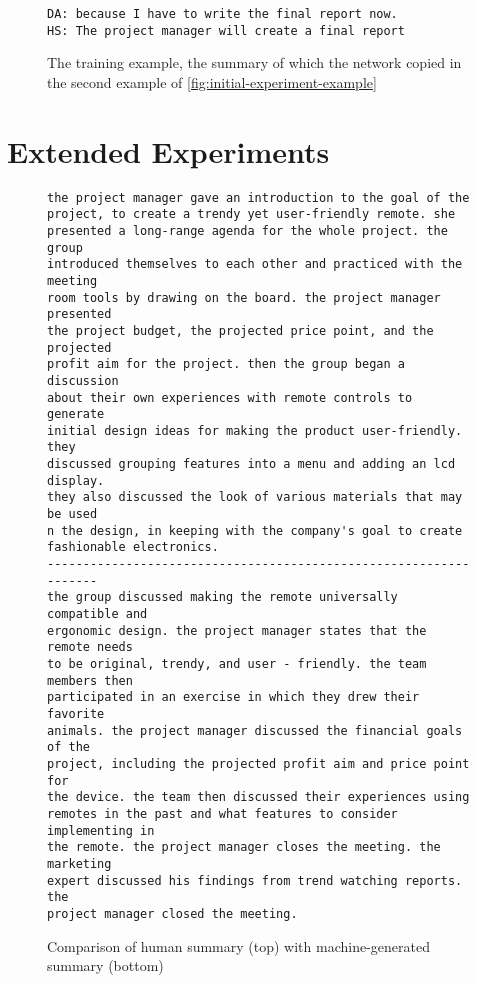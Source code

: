 \begin{figure}[h]
\begin{lstlisting}[numbers=none]
DA: because I have to write the final report now.
HS: The project manager will create a final report
\end{lstlisting}
\caption{The training example, the summary of which the network copied in the second example of \cref{fig:initial-experiment-example}}
\label{fig:initial-experiment-training-example}
\end{figure}


\section{Extended Experiments}

\begin{figure}[h]
\begin{lstlisting}[numbers=none]
the project manager gave an introduction to the goal of the
project, to create a trendy yet user-friendly remote. she
presented a long-range agenda for the whole project. the group
introduced themselves to each other and practiced with the meeting
room tools by drawing on the board. the project manager presented
the project budget, the projected price point, and the projected
profit aim for the project. then the group began a discussion
about their own experiences with remote controls to generate
initial design ideas for making the product user-friendly. they
discussed grouping features into a menu and adding an lcd display.
they also discussed the look of various materials that may be used 
n the design, in keeping with the company's goal to create
fashionable electronics. 
------------------------------------------------------------------
the group discussed making the remote universally compatible and
ergonomic design. the project manager states that the remote needs
to be original, trendy, and user - friendly. the team members then
participated in an exercise in which they drew their favorite
animals. the project manager discussed the financial goals of the
project, including the projected profit aim and price point for
the device. the team then discussed their experiences using
remotes in the past and what features to consider implementing in
the remote. the project manager closes the meeting. the marketing
expert discussed his findings from trend watching reports. the
project manager closed the meeting. 
\end{lstlisting}
\caption[Comparison of human summary with machine-generated summary]{Comparison of human summary (top) with machine-generated summary (bottom)}
\label{fig:extended-experiment-example}
\end{figure}

